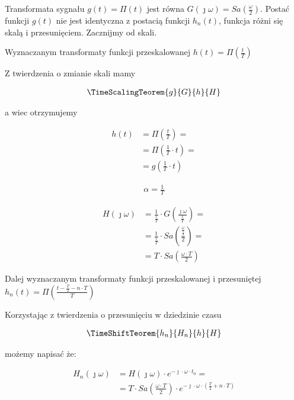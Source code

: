 \begin{task}
Transformata sygnału $g(t) = \Pi(t)$ jest równa $G(\jmath \omega)=Sa(\frac{\omega}{2})$. Postać funkcji $g(t)$ nie jest identyczna z postacią funkcji $h_n(t)$, funkcja różni się skalą i przesunięciem. Zacznijmy od skali. 

Wyznaczanym transformaty funkcji przeskalowanej $h(t)=\Pi\left(\frac{t}{T}\right)$

Z twierdzenia o zmianie skali mamy 

\begin{align*}
\TimeScalingTeorem{g}{G}{h}{H}
\end{align*}

a wiec otrzymujemy

\begin{align*}
h(t) &= \Pi\left(\frac{t}{T}\right)=\\
&=\Pi\left(\frac{1}{T}\cdot t\right)=\\
&=g\left(\frac{1}{T}\cdot t\right)
\end{align*}

\begin{align*}
\alpha=\frac{1}{T}
\end{align*}

\begin{align*}
H(\jmath \omega)&=\frac{1}{\frac{1}{T}} \cdot G\left(\frac{\jmath \omega}{\frac{1}{T}}\right)=\\
&=\frac{1}{\frac{1}{T}} \cdot Sa\left(\frac{\frac{\omega}{\frac{1}{T}}}{2}\right)=\\
&=T \cdot Sa\left(\frac{\omega \cdot T}{2}\right)
\end{align*}

Dalej wyznaczanym transformaty funkcji przeskalowanej i przesuniętej $h_n(t)=\Pi\left(\frac{t - \frac{T}{2} -n\cdot T }{T}\right)$

Korzystając z twierdzenia o przesunięciu w dziedzinie czasu 

\begin{align*}
\TimeShiftTeorem{h_n}{H_n}{h}{H}
\end{align*}

możemy napisać że:

\begin{align*}
H_n(\jmath\omega) &= H(\jmath\omega) \cdot e^{-\jmath \cdot \omega \cdot t_0}=\\
&=T \cdot Sa\left(\frac{\omega \cdot T}{2}\right) \cdot e^{-\jmath \cdot \omega \cdot \left(\frac{T}{2} + n\cdot T\right)}
\end{align*}


\end{task}

